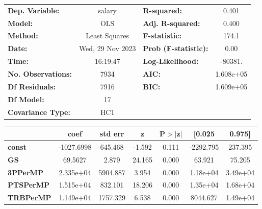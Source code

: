 \begin{center}
\begin{tabular}{lclc}
\toprule
\textbf{Dep. Variable:}             &      salary      & \textbf{  R-squared:         } &     0.401   \\
\textbf{Model:}                     &       OLS        & \textbf{  Adj. R-squared:    } &     0.400   \\
\textbf{Method:}                    &  Least Squares   & \textbf{  F-statistic:       } &     174.1   \\
\textbf{Date:}                      & Wed, 29 Nov 2023 & \textbf{  Prob (F-statistic):} &     0.00    \\
\textbf{Time:}                      &     16:19:47     & \textbf{  Log-Likelihood:    } &   -80381.   \\
\textbf{No. Observations:}          &        7934      & \textbf{  AIC:               } & 1.608e+05   \\
\textbf{Df Residuals:}              &        7916      & \textbf{  BIC:               } & 1.609e+05   \\
\textbf{Df Model:}                  &          17      & \textbf{                     } &             \\
\textbf{Covariance Type:}           &       HC1        & \textbf{                     } &             \\
\bottomrule
\end{tabular}
\begin{tabular}{lcccccc}
                                    & \textbf{coef} & \textbf{std err} & \textbf{z} & \textbf{P$> |$z$|$} & \textbf{[0.025} & \textbf{0.975]}  \\
\midrule
\textbf{const}                      &   -1027.6998  &      645.468     &    -1.592  &         0.111        &    -2292.795    &      237.395     \\
\textbf{GS}                         &      69.5627  &        2.879     &    24.165  &         0.000        &       63.921    &       75.205     \\
\textbf{3PPerMP}                    &    2.335e+04  &     5904.887     &     3.954  &         0.000        &     1.18e+04    &     3.49e+04     \\
\textbf{PTSPerMP}                   &    1.515e+04  &      832.101     &    18.206  &         0.000        &     1.35e+04    &     1.68e+04     \\
\textbf{TRBPerMP}                   &    1.149e+04  &     1757.329     &     6.538  &         0.000        &     8044.627    &     1.49e+04     \\

\end{tabular}
\end{center}
